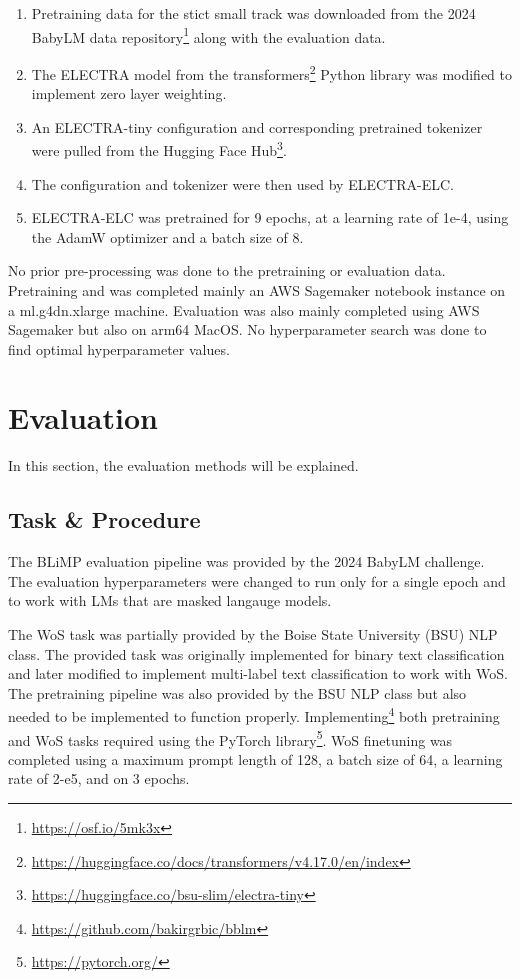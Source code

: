 \documentclass[11pt]{article}
\begin{document}
\begin{enumerate}
    \item Pretraining data for the stict small track was downloaded from the 2024 BabyLM data repository\footnote{\url{https://osf.io/5mk3x}} along with the evaluation data.
    \item The ELECTRA model from the transformers\footnote{\url{https://huggingface.co/docs/transformers/v4.17.0/en/index}} Python library was modified to implement zero layer weighting.
    \item An ELECTRA-tiny configuration and corresponding pretrained tokenizer
were pulled from the Hugging Face Hub\footnote{\url{https://huggingface.co/bsu-slim/electra-tiny}}.
    \item The configuration and tokenizer were then used by ELECTRA-ELC.
    \item ELECTRA-ELC was pretrained for 9 epochs, at a learning rate of 1e-4, using the AdamW optimizer and a batch size of 8.
\end{enumerate}
No prior pre-processing was done to the pretraining or evaluation data. Pretraining
and was completed mainly an AWS Sagemaker notebook instance on a ml.g4dn.xlarge 
machine. Evaluation was also mainly completed 
using AWS Sagemaker but also on arm64 MacOS.
No hyperparameter search was done to find optimal hyperparameter values.


\section{Evaluation}

In this section, the evaluation methods will be explained.


\subsection{Task \& Procedure}

The BLiMP evaluation pipeline was provided by the 2024 BabyLM challenge. The evaluation
hyperparameters were changed to run only for a single
epoch and to work with LMs that are masked langauge
models.

The WoS task was partially provided by the Boise State University (BSU) NLP class. The provided
task was originally implemented for binary  text classification and later modified to implement
multi-label text classification to work with WoS. The pretraining pipeline was also provided
by the BSU NLP class but also needed to be implemented to function properly. Implementing\footnote{\url{https://github.com/bakirgrbic/bblm}}
both pretraining and WoS tasks required using the PyTorch library\footnote{\url{https://pytorch.org/}}.
WoS finetuning was completed using a maximum prompt length of 128, a batch size of 64, a learning rate of 2-e5, and on 3 epochs.
\end{document}
